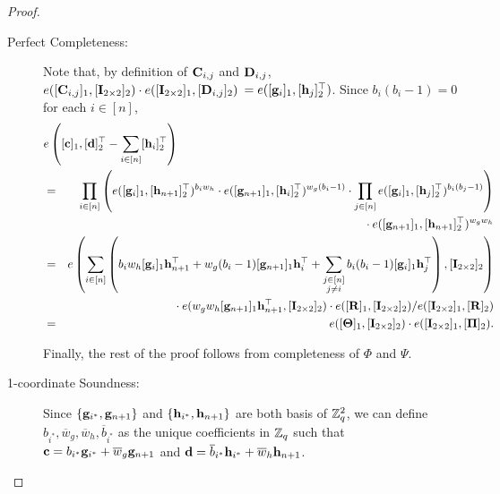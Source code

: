 \begin{theorem}
\begin{enumerate}[label=\alph*)]
\end{enumerate}
\end{theorem}	
\begin{proof}
\begin{description}
\item[Perfect Completeness:]
Note that,
by definition of $\mathbf{{C}}_{i,j}$ and $\mathbf{{D}}_{i,j}$, 
$e([\mathbf{{C}}_{i,j}]_1,[\mathbf{{I}}_{2\times2}]_2)\cdot e([\mathbf{{I}}_{2\times2}]_1,[\mathbf{{D}}_{i,j}]_2)$
$= e([\mathbf{g}_{i}]_1,[\mathbf{h}_j]_2^\top)$.  Since $b_i(b_i-1) = 0$ for each $i\in[n]$,
\begin{eqnarray*}
\lefteqn{
e\left([\vecb{c}]_1, [\vecb{d}]_2^\top - \sum_{i\in[n]} [\vecb{h}_{i}]_2^\top \right)}\\
& = & 
    \prod_{i \in [n]}\left(
        e([\vecb{g}_{i}]_1,[\vecb{h}_{n+1}]_2^{\top})^{b_i w_h}\cdot
        e([\vecb{g}_{n+1}]_1,[\vecb{h}_i]_2^{\top})^{w_g(b_i-1)}\cdot
        \prod_{j \in [n]} e([\vecb{g}_{i}]_1,[\vecb{h}_{j}]_2^{\top})^{b_i (b_j-1)}
    \right) 
\\ & & \mbox{ }
    \cdot e([\vecb{g}_{n+1}]_1,[\vecb{h}_{n+1}]_2^{\top})^{w_gw_h}\\
& = & 
    e\left(\sum_{i\in[n]}\left(b_iw_h[\vecb{g}_{i}]_1\vecb{h}_{n+1}^{\top}+w_g(b_i-1)[\vecb{g}_{n+1}]_1\vecb{h}_i^{\top}+
        \sum_{\substack{j \in [n]\\j\neq i}}b_i(b_i-1)[\vecb{g}_{i}]_1\vecb{h}_{j}^{\top}\right),[\matr{I}_{2\times 2}]_2
    \right)
\\ & & \mbox{ }
    \cdot e(w_gw_h[\vecb{g}_{n+1}]_1\vecb{h}_{n+1}^{\top},[\matr{I}_{2\times 2}]_2)
    \cdot e([\matr{R}]_1,[\matr{I}_{2\times2}]_2)/e([\matr{I}_{2\times2}]_1,[\matr{R}]_2)
\\ & = &
    e([\matr{\Theta}]_1,[\matr{I}_{2\times2}]_2)\cdot
    e([\matr{I}_{2\times2}]_1,[\matr{\Pi}]_2).
\end{eqnarray*}

Finally, the rest of the proof follows from completeness of $\Phi$ and $\Psi$. 

\item[1-coordinate Soundness:]
Since $\{\mathbf{g}_{i^*},\mathbf{g}_{n+1}\}$ and $\{\mathbf{h}_{i^*},\mathbf{h}_{n+1}\}$ are both basis of $\mathbb{Z}_q^2$,
we can define $b_{i^*},\overline{w}_g,\overline{w}_h,\overline{b}_{i^*}$ as the unique coefficients in $\mathbb{Z}_q$ such that $\mathbf{c}=b_{i^*}\mathbf{g}_{i^*} + \overline{w}_g \mathbf{g}_{n+1}$ and $\mathbf{d}= \overline{b}_{i^*} \mathbf{h}_{i^*} + \overline{w}_h \mathbf{h}_{n+1}$.


\end{description}
\end{proof}
